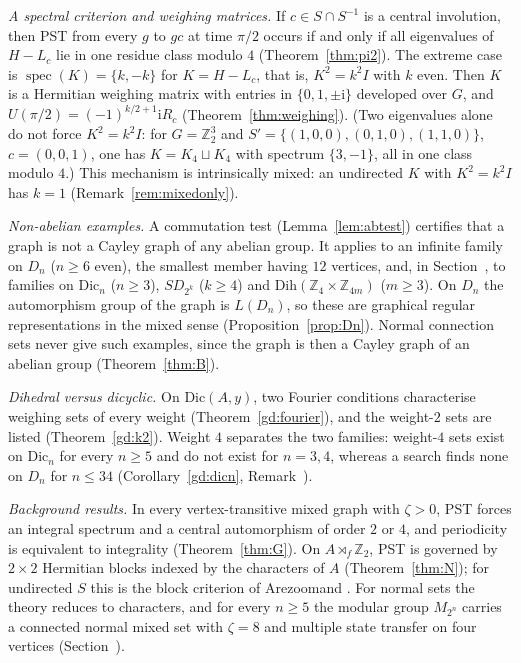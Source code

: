 \documentclass[preprint,11pt]{elsarticle}
\makeatletter
\theoremstyle{definition}
\theoremstyle{remark}
\newcommand{\Z}{\mathbb Z}
\newcommand{\ii}{\mathrm i}
\newcommand{\SR}[1]{\@nameuse{SR@#1}}
\makeatother
\begin{document}
\medskip\noindent\emph{A spectral criterion and weighing matrices.} If $c\in S\cap S^{-1}$ is a central involution, then PST from every $g$ to $gc$ at time $\pi/2$ occurs if and only if all eigenvalues of $H-L_c$ lie in one residue class modulo $4$ (Theorem~\ref{thm:pi2}). The extreme case is $\operatorname{spec}(K)=\{k,-k\}$ for $K=H-L_c$, that is, $K^2=k^2I$ with $k$ even. Then $K$ is a Hermitian weighing matrix with entries in $\{0,1,\pm\ii\}$ developed over $G$, and $U(\pi/2)=(-1)^{k/2+1}\ii R_c$ (Theorem~\ref{thm:weighing}). (Two eigenvalues alone do not force $K^2=k^2I$: for $G=\Z_2^3$ and $S'=\{(1,0,0),(0,1,0),(1,1,0)\}$, $c=(0,0,1)$, one has $K=K_4\sqcup K_4$ with spectrum $\{3,-1\}$, all in one class modulo $4$.) This mechanism is intrinsically mixed: an undirected $K$ with $K^2=k^2I$ has $k=1$ (Remark~\ref{rem:mixedonly}).

\emph{Non-abelian examples.} A commutation test (Lemma~\ref{lem:abtest}) certifies that a graph is not a Cayley graph of any abelian group. It applies to an infinite family on $D_n$ ($n\ge6$ even), the smallest member having $12$ vertices, and, in Section~\SR{app:fam}, to families on $\mathrm{Dic}_n$ ($n\ge3$), $SD_{2^k}$ ($k\ge4$) and $\mathrm{Dih}(\Z_4\times\Z_{4m})$ ($m\ge3$). On $D_n$ the automorphism group of the graph is $L(D_n)$, so these are graphical regular representations in the mixed sense (Proposition~\ref{prop:Dn}). Normal connection sets never give such examples, since the graph is then a Cayley graph of an abelian group (Theorem~\ref{thm:B}).

\emph{Dihedral versus dicyclic.} On $\mathrm{Dic}(A,y)$, two Fourier conditions characterise weighing sets of every weight (Theorem~\ref{gd:fourier}), and the weight-$2$ sets are listed (Theorem~\ref{gd:k2}). Weight $4$ separates the two families: weight-$4$ sets exist on $\mathrm{Dic}_n$ for every $n\ge5$ and do not exist for $n=3,4$, whereas a search finds none on $D_n$ for $n\le34$ (Corollary~\ref{gd:dicn}, Remark~\SR{rem:kgen}).

\emph{Background results.} In every vertex-transitive mixed graph with $\zeta>0$, PST forces an integral spectrum and a central automorphism of order $2$ or $4$, and periodicity is equivalent to integrality (Theorem~\ref{thm:G}). On $A\rtimes_f\Z_2$, PST is governed by $2\times2$ Hermitian blocks indexed by the characters of $A$ (Theorem~\ref{thm:N}); for undirected $S$ this is the block criterion of Arezoomand \cite{Arezoomand}. For normal sets the theory reduces to characters, and for every $n\ge5$ the modular group $M_{2^n}$ carries a connected normal mixed set with $\zeta=8$ and multiple state transfer on four vertices (Section~\SR{app:normal}).
\end{document}
